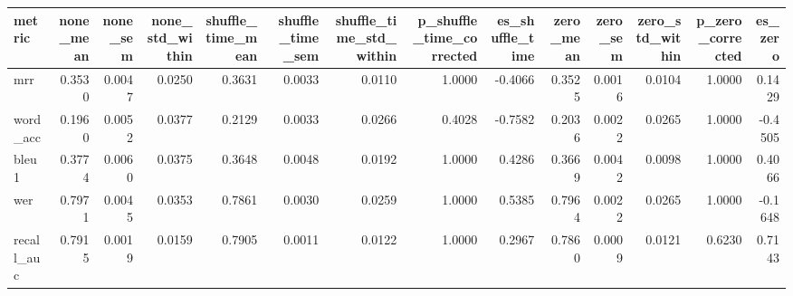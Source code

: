 \begin{tabular}{lrrrrrrrrrrrrr}
\toprule
metric & none_mean & none_sem & none_std_within & shuffle_time_mean & shuffle_time_sem & shuffle_time_std_within & p_shuffle_time_corrected & es_shuffle_time & zero_mean & zero_sem & zero_std_within & p_zero_corrected & es_zero \\
\midrule
mrr & 0.3530 & 0.0047 & 0.0250 & 0.3631 & 0.0033 & 0.0110 & 1.0000 & -0.4066 & 0.3525 & 0.0016 & 0.0104 & 1.0000 & 0.1429 \\
word_acc & 0.1960 & 0.0052 & 0.0377 & 0.2129 & 0.0033 & 0.0266 & 0.4028 & -0.7582 & 0.2036 & 0.0022 & 0.0265 & 1.0000 & -0.4505 \\
bleu1 & 0.3774 & 0.0060 & 0.0375 & 0.3648 & 0.0048 & 0.0192 & 1.0000 & 0.4286 & 0.3669 & 0.0042 & 0.0098 & 1.0000 & 0.4066 \\
wer & 0.7971 & 0.0045 & 0.0353 & 0.7861 & 0.0030 & 0.0259 & 1.0000 & 0.5385 & 0.7964 & 0.0022 & 0.0265 & 1.0000 & -0.1648 \\
recall_auc & 0.7915 & 0.0019 & 0.0159 & 0.7905 & 0.0011 & 0.0122 & 1.0000 & 0.2967 & 0.7860 & 0.0009 & 0.0121 & 0.6230 & 0.7143 \\
\bottomrule
\end{tabular}
